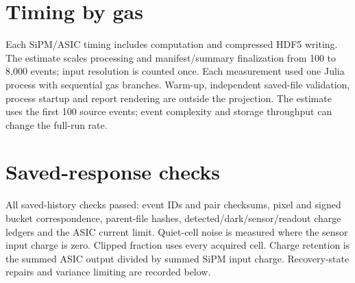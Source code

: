 \documentclass[10pt,a4paper]{article}
\begin{document}
\section*{Timing by gas}
\begin{center}\end{center}
Each SiPM/ASIC timing includes computation and compressed HDF5 writing. The estimate scales processing and manifest/summary finalization from 100 to 8,000 events; input resolution is counted once. Each measurement used one Julia process with sequential gas branches. Warm-up, independent saved-file validation, process startup and report rendering are outside the projection. The estimate uses the first 100 source events; event complexity and storage throughput can change the full-run rate.\section*{Saved-response checks}
All saved-history checks passed: event IDs and pair checksums, pixel and signed bucket correspondence, parent-file hashes, detected/dark/sensor/readout charge ledgers and the ASIC current limit. Quiet-cell noise is measured where the sensor input charge is zero. Clipped fraction uses every acquired cell. Charge retention is the summed ASIC output divided by summed SiPM input charge. Recovery-state repairs and variance limiting are recorded below.\begin{center}\end{center}
\end{document}
